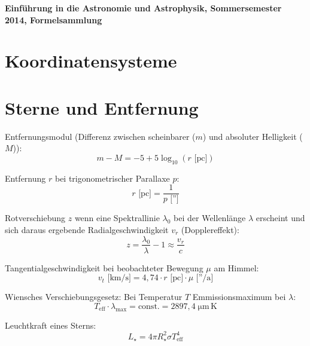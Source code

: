 \documentclass[a4paper,german,12pt,smallheadings]{scrartcl}
\begin{document}
\allowdisplaybreaks %
\begin{center}
\bfseries %
\sffamily %
\vspace{-40pt}
Einführung in die Astronomie und Astrophysik, Sommersemester 2014, Formelsammlung
\vspace{-10pt}
\end{center}
\section*{Koordinatensysteme}

\section*{Sterne und Entfernung}

Entfernungsmodul (Differenz zwischen scheinbarer ($m$) und absoluter Helligkeit
($M$)):
\begin{equation}
  m - M = -5 + 5 \log_{10}(r \text{ [pc]})
\end{equation}

Entfernung $r$ bei trigonometrischer Parallaxe $p$:
\begin{equation}
  r\text{ [pc]} = \frac{1}{p\text{ ['']}}
\end{equation}

Rotverschiebung $z$ wenn eine Spektrallinie $\lambda_0$ bei der Wellenlänge
$\lambda$ erscheint und sich daraus ergebende Radialgeschwindigkeit $v_r$
(Dopplereffekt):
\begin{equation}
  z = \frac{\lambda_0}{\lambda} - 1 \approx \frac{v_r}{c}
\end{equation}

Tangentialgeschwindigkeit bei beobachteter Bewegung $\mu$ am Himmel:
\begin{equation}
  v_t \text{ [km/s]} = 4{,}74 \cdot r \text{ [pc]} \cdot \mu \text{ [''/a]}
\end{equation}

Wiensches Verschiebungsgesetz: Bei Temperatur $T$ Emmissionsmaximum bei $\lambda$:
\begin{equation}
  T_\text{eff} \cdot \lambda_\text{max} = \text{const.} = 2897{,}4 \; \mathrm{\mu m\, K}
\end{equation}

Leuchtkraft eines Sterns:
\begin{equation}
  L_\star = 4 \pi R_\star^2 \sigma T^4_\text{eff}
\end{equation}
\end{document}
